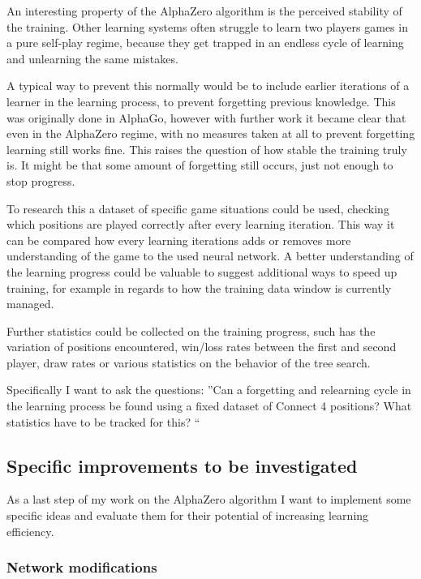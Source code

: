\documentclass[12pt,onecolumn,oneside,titlepage]{article}
\begin{document}
An interesting property of the AlphaZero algorithm is the perceived stability of the training. Other learning systems often struggle to learn two players games in a pure self-play regime, because they get trapped in an endless cycle of learning and unlearning the same mistakes.

A typical way to prevent this normally would be to include earlier iterations of a learner in the learning process, to prevent forgetting previous knowledge.
This was originally done in AlphaGo, however with further work it became clear that even in the AlphaZero regime, with no measures taken at all to prevent forgetting learning still works fine.
This raises the question of how stable the training truly is. It might be that some amount of forgetting still occurs, just not enough to stop progress.

To research this a dataset of specific game situations could be used, checking which positions are played correctly after every learning iteration. This way it can be compared how every learning iterations adds or removes more understanding of the game to the used neural network.
A better understanding of the learning progress could be valuable to suggest additional ways to speed up training, for example in regards to how the training data window is currently managed.

Further statistics could be collected on the training progress, such has the variation of positions encountered, win/loss rates between the first and second player, draw rates or various statistics on the behavior of the tree search.

Specifically I want to ask the questions: ''Can a forgetting and relearning cycle in the learning process be found using a fixed dataset of Connect 4 positions? What statistics have to be tracked for this? ``

\subsection{Specific improvements to be investigated}

As a last step of my work on the AlphaZero algorithm I want to implement some specific ideas and evaluate them for their potential of increasing learning efficiency.

\subsubsection{Network modifications}
\end{document}

